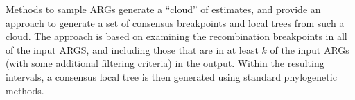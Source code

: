 \documentclass[9pt,twocolumn,twoside]{gsajnl}
\begin{document}
Methods to sample ARGs generate a ``cloud'' of estimates, and
\cite{kuhner2017consensus} provide an approach to generate a
set of consensus breakpoints and local trees from
such a cloud.
The approach is based on examining the recombination breakpoints
in all of the input ARGS, and including those that are
in at least $k$ of the input ARGs (with some additional
filtering criteria) in the output.
Within the resulting intervals, a consensus
local tree is then generated using standard phylogenetic methods.


\end{document}

